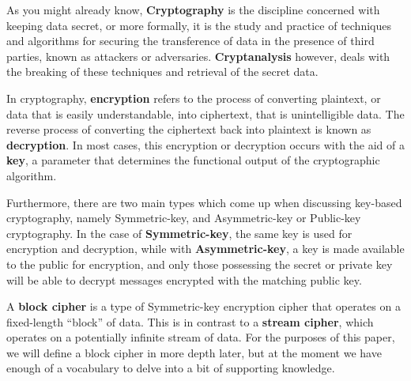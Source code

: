As you might already know, \textbf{Cryptography} is the discipline concerned
with keeping data secret, or more formally, it is the study and practice of
techniques and algorithms for securing the transference of data in the presence
of third parties, known as attackers or adversaries.  \textbf{Cryptanalysis}
however, deals with the breaking of these techniques and retrieval of the
secret data. 

In cryptography, \textbf{encryption} refers to the process of converting
plaintext, or data that is easily understandable, into ciphertext, that is
unintelligible data. The reverse process of converting the ciphertext back
into plaintext is known as \textbf{decryption}. In most cases, this encryption
or decryption occurs with the aid of a \textbf{key}, a parameter that
determines the functional output of the cryptographic algorithm.

Furthermore, there are two main types which come up when discussing key-based
cryptography, namely Symmetric-key, and Asymmetric-key or Public-key
cryptography.  In the case of \textbf{Symmetric-key}, the same key is used for
encryption and decryption, while with \textbf{Asymmetric-key}, a key is made
available to the public for encryption, and only those possessing the secret or
private key will be able to decrypt messages encrypted with the matching public
key.

A \textbf{block cipher} is a type of Symmetric-key encryption cipher that
operates on a fixed-length ``block'' of data. This is in contrast to a
\textbf{stream cipher}, which operates on a potentially infinite stream of
data. For the purposes of this paper, we will define a block cipher in more
depth later, but at the moment we have enough of a vocabulary to delve into a
bit of supporting knowledge.
